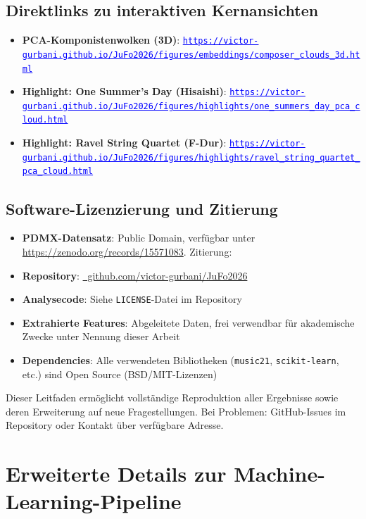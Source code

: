 \documentclass[10pt,a4paper]{article}
\theoremstyle{definition}
\newcommand{\linkurl}[1]{\href{#1}{\textcolor{blue}{\underline{\small\nolinkurl{#1}}}}}
\begin{document}
\subsection{Direktlinks zu interaktiven Kernansichten}
\begin{itemize}
    \item \textbf{PCA-Komponistenwolken (3D)}: \newline\linkurl{https://victor-gurbani.github.io/JuFo2026/figures/embeddings/composer_clouds_3d.html}
    \item \textbf{Highlight: One Summer's Day (Hisaishi)}: \newline\linkurl{https://victor-gurbani.github.io/JuFo2026/figures/highlights/one_summers_day_pca_cloud.html}
    \item \textbf{Highlight: Ravel String Quartet (F-Dur)}: \newline\linkurl{https://victor-gurbani.github.io/JuFo2026/figures/highlights/ravel_string_quartet_pca_cloud.html}
\end{itemize}

\subsection{Software-Lizenzierung und Zitierung}

\begin{itemize}
    \item \textbf{PDMX-Datensatz}: Public Domain, verfügbar unter \url{https://zenodo.org/records/15571083}. Zitierung: \cite{PDMX2024}
    \item \textbf{Repository}: \href{https://github.com/victor-gurbani/JuFo2026/}{\faGithub\ github.com/victor-gurbani/JuFo2026}
    \item \textbf{Analysecode}: Siehe \texttt{LICENSE}-Datei im Repository
    \item \textbf{Extrahierte Features}: Abgeleitete Daten, frei verwendbar für akademische Zwecke unter Nennung dieser Arbeit
    \item \textbf{Dependencies}: Alle verwendeten Bibliotheken (\texttt{music21}, \texttt{scikit-learn}, etc.) sind Open Source (BSD/MIT-Lizenzen)
\end{itemize}

Dieser Leitfaden ermöglicht vollständige Reproduktion aller Ergebnisse sowie deren Erweiterung auf neue Fragestellungen. Bei Problemen: GitHub-Issues im Repository oder Kontakt über verfügbare Adresse.

\clearpage
\section{Erweiterte Details zur Machine-Learning-Pipeline}\label{app:D}
\end{document}
